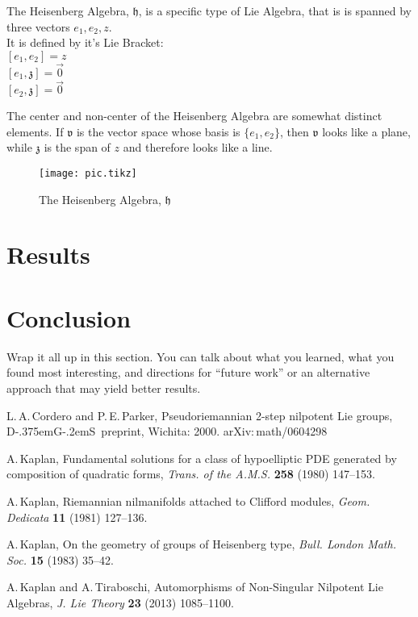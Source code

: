 \documentclass[11 pt]{article}
\newcommand{\DGS}{D{\kern-.375em}G{\kern-.2em}S}
\newcommand{\fz}{\mathfrak{z}}
\newcommand{\fv}{\mathfrak{v}}
\newcommand{\fh}{\mathfrak{h}}
\begin{document}
\begin{definition}
    The Heisenberg Algebra, $\fh$,  is a specific type of Lie Algebra, that is is
    spanned by three vectors $e_1, e_2, z$.
    \\It is defined by it's Lie Bracket:
    \\$[e_1, e_2] = z$
    \\$[e_1, \fz] = \Vec{0}$
    \\$[e_2, \fz] = \Vec{0}$
\end{definition}
The center and non-center of the Heisenberg Algebra are somewhat distinct elements.  
If $\fv$ is the vector space whose basis is $\{e_1, e_2\}$, then 
$\fv$ looks like a plane, while $\fz$ is the span of $z$ and therefore looks like
a line.

\begin{figure}[h]
    \centering
    \texttt{[image: pic.tikz]} %
        \label{fig:pic} %
    \caption{\footnotesize The Heisenberg Algebra, $\fh$} %
\end{figure}

\pagebreak



\section{Results}

\section{Conclusion}

Wrap it all up in this section. You can talk about what you learned, what
you found most interesting, and directions for ``future work'' or an alternative
approach that may yield better results.

\begin{thebibliography}{99}
L.\,A.\,Cordero and P.\,E.\,Parker, Pseudoriemannian 2-step
nilpotent Lie groups, \DGS\ preprint, Wichita: 2000.
{\sf arXiv:\,math/0604298}

A.\,Kaplan, Fundamental solutions for a class of hypoelliptic PDE
generated by composition of quadratic forms, {\it Trans. of the A.M.S.} {\bf 258}
(1980) 147--153.

A.\,Kaplan, Riemannian nilmanifolds attached to Clifford modules,
{\it Geom. Dedicata} {\bf 11} (1981) 127--136.

A.\,Kaplan, On the geometry of groups of Heisenberg type, {\it Bull.
London Math. Soc.} {\bf 15} (1983) 35--42.

A.\,Kaplan and A.\,Tiraboschi, Automorphisms of Non-Singular
Nilpotent Lie Algebras, {\it J. Lie Theory} {\bf 23} (2013) 1085--1100.
\end{thebibliography}
\end{document}
